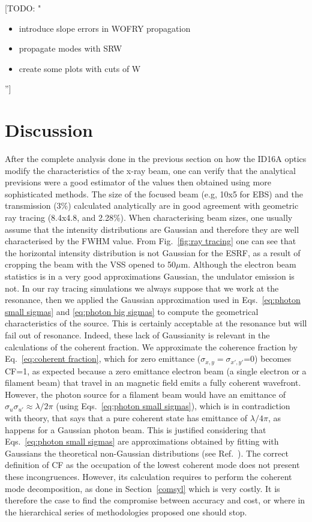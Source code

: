 \documentclass{iucr}              %
\newcommand{\todo}[1]{{\color{red}[TODO: "#1'']}}
\begin{document}
\todo{
\begin{itemize}
 \item introduce slope errors in WOFRY propagation
 \item propagate modes with SRW
 \item create some plots with cuts of W
\end{itemize}
}
 

\section{Discussion} 
\label{discussion}

After the complete analysis done in the previous section on how the ID16A optics modify the characteristics of the x-ray beam, one can verify that the analytical previsions were a good estimator of the values then obtained using more sophisticated methods. The size of the focused beam (e.g, 10x5 for EBS) and the transmission (3\%) calculated analytically are in good agreement with geometric ray tracing (8.4x4.8, and 2.28\%). When characterising beam sizes, one usually assume that the intensity distributions are Gaussian and therefore they are well characterised by the FWHM value. From Fig.~\ref{fig:ray tracing} one can see that the horizontal intensity distribution is not Gaussian for the ESRF, as a result of cropping the beam with the VSS opened to 50$\mu$m. Although the electron beam statistics is in a very good approximations Gaussian, the undulator emission is not. In our ray tracing simulations we always suppose that we work at the resonance, then we applied the Gaussian approximation used in Eqs.~\ref{eq:photon small sigmas} and \ref{eq:photon big sigmas} to compute the geometrical characteristics of the source. This is certainly acceptable at the resonance but will fail out of resonance. Indeed, these lack of Gaussianity is relevant in the calculations of the coherent fraction. We approximate the coherence fraction by Eq.~\ref{eq:coherent fraction}, which for zero emittance ($\sigma_{x,y}=\sigma_{x',y'}$=0) becomes CF=1, as expected because a zero emittance electron beam (a single electron or a filament beam) that travel in an magnetic field emits a fully coherent wavefront. However, the photon source for a filament beam would have an emittance of $\sigma_u \sigma_{u'} \approx \lambda / 2 \pi$ (using Eqs.~\ref{eq:photon small sigmas}), which is in contradiction with theory, that says that a pure coherent state has emittance of $\lambda / 4 \pi$, as happens for a Gaussian photon beam. This is justified considering that Eqs.~\ref{eq:photon small sigmas} are approximations obtained by fitting with Gaussians the theoretical non-Gaussian distributions (see Ref.~\cite{elleaume}). The correct definition of CF as the occupation of the lowest coherent mode does not present these incongruences. However, its calculation requires to perform the coherent mode decomposition, as done in Section~\ref{comsyl} which is very costly. It is therefore the case to find the compromise between accuracy and cost, or where in the hierarchical series of methodologies proposed one should stop. 
\end{document}

